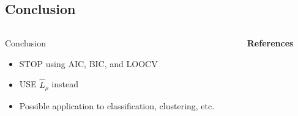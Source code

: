 \documentclass[,table]{beamer}
\begin{document}
\begin{frame}{}
  \section{Conclusion}
  \begin{columns}
    \begin{column}{.45\linewidth}
      \begin{block}{Conclusion}
	\begin{itemize}
        \item STOP using AIC, BIC, and LOOCV
        \item USE $\hat{L}_\rho$ instead
        \item Possible application to classification, clustering, etc.
        \end{itemize}
        \vspace{5pt}
      \end{block}
    \end{column}   
    

    \begin{column}{.45\linewidth}
      \textbf{References}
      {\footnotesize
        
        
      }
    \end{column}
  \end{columns}

\end{frame}
\end{document}
